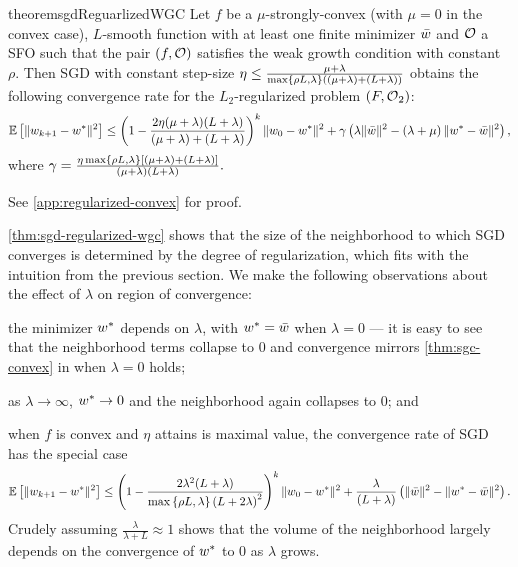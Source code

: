 \begin{restatable}{theorem}{sgdReguarlizedWGC}\label{thm:sgd-regularized-wgc}
    Let \( f \) be a \( \mu \)-strongly-convex (with \( \mu = 0 \) in the convex case), \( L \)-smooth function with at least one finite minimizer \( \wbar \) and \( \oracle{} \) a SFO such that the pair \( \rbr{f, \oracle{}} \) satisfies the weak growth condition with constant \( \rho \).
    Then SGD with constant step-size \( \eta \leq \frac{\mu + \lambda}{\max\cbr{\rho L, \lambda}\rbr{(\mu + \lambda) + (L + \lambda)}} \) obtains the following convergence rate for the \( L_2 \)-regularized problem \( \rbr{F, \oracle{}_2} \):
    \[  \E\sbr{\norm{\wkk - \wopt}^2} \leq \rbr{1 - \frac{2 \eta (\mu + \lambda)(L + \lambda)}{(\mu + \lambda) + (L + \lambda)}}^k \norm{\w_0 - \wopt}^2 + \gamma\rbr{\lambda \norm{\wbar}^2 - \rbr{\lambda + \mu}\norm{\wopt - \wbar}^2}, \]
    where \( \gamma = \frac{\eta \max\cbr{\rho L, \lambda} \sbr{(\mu + \lambda) + (L + \lambda)}}{(\mu + \lambda)(L + \lambda)}. \)  
\end{restatable}
\noindent See \autoref{app:regularized-convex} for proof. \hfill \break

\autoref{thm:sgd-regularized-wgc} shows that the size of the neighborhood to which SGD converges is determined by the degree of regularization, which fits with the intuition from the previous section.
We make the following observations about the effect of \( \lambda \) on region of convergence:
\begin{inparaenum}[(i)]
\item the minimizer \( \wopt \) depends on \( \lambda \), with \( \wopt = \wbar \) when \( \lambda = 0 \) --- it is easy to see that the neighborhood terms collapse to \( 0 \) and convergence mirrors \autoref{thm:sgc-convex} in when \( \lambda = 0 \) holds;
\item as \( \lambda \rightarrow \infty \), \( \wopt \rightarrow 0 \) and the neighborhood again collapses to \( 0 \); and 
\item when \( f \) is convex and \( \eta \) attains is maximal value, the convergence rate of SGD has the special case 
\[  \E\sbr{\norm{\wkk - \wopt}^2} \leq \rbr{1 - \frac{2 \lambda^2(L + \lambda)}{\max\cbr{\rho L, \lambda} \rbr{L + 2\lambda}^2}}^k \norm{\w_0 - \wopt}^2 + \frac{\lambda}{\rbr{L + \lambda}}\rbr{\norm{\wbar}^2 - \norm{\wopt - \wbar}^2}. \]
Crudely assuming \( \frac{\lambda}{\lambda + L} \approx 1 \) shows that the volume of the neighborhood largely depends on the convergence of \( \wopt \) to \( 0 \) as \( \lambda \) grows.
\end{inparaenum}


